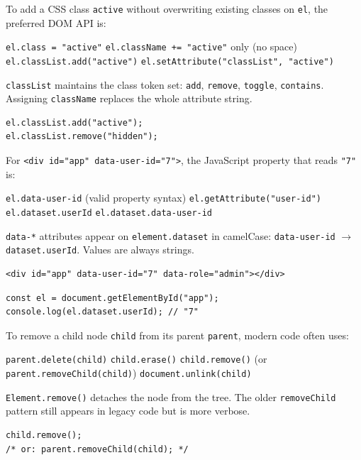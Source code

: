 \newpage
\question[4]
To add a CSS class \texttt{active} without overwriting existing classes on \texttt{el}, the preferred DOM API is:
\begin{choices}
  \choice \texttt{el.class = "active"}
  \choice \texttt{el.className += "active"} only (no space)
  \CorrectChoice \texttt{el.classList.add("active")}
  \choice \texttt{el.setAttribute("classList", "active")}
\end{choices}
\begin{solution}
  \texttt{classList} maintains the class token set: \texttt{add}, \texttt{remove}, \texttt{toggle}, \texttt{contains}. Assigning \texttt{className} replaces the whole attribute string.
\begin{lstlisting}[style=js]
el.classList.add("active");
el.classList.remove("hidden");
\end{lstlisting}
\end{solution}

\question[4]
For \texttt{<div id="app" data-user-id="7">}, the JavaScript property that reads \texttt{"7"} is:
\begin{choices}
  \choice \texttt{el.data-user-id} (valid property syntax)
  \choice \texttt{el.getAttribute("user-id")}
  \CorrectChoice \texttt{el.dataset.userId}
  \choice \texttt{el.dataset.data-user-id}
\end{choices}
\begin{solution}
  \texttt{data-*} attributes appear on \texttt{element.dataset} in camelCase: \texttt{data-user-id} $\rightarrow$ \texttt{dataset.userId}. Values are always strings.
\begin{lstlisting}[style=htmlinline]
<div id="app" data-user-id="7" data-role="admin"></div>
\end{lstlisting}
\begin{lstlisting}[style=js]
const el = document.getElementById("app");
console.log(el.dataset.userId); // "7"
\end{lstlisting}
\end{solution}

\question[4]
To remove a child node \texttt{child} from its parent \texttt{parent}, modern code often uses:
\begin{choices}
  \choice \texttt{parent.delete(child)}
  \choice \texttt{child.erase()}
  \CorrectChoice \texttt{child.remove()} (or \texttt{parent.removeChild(child)})
  \choice \texttt{document.unlink(child)}
\end{choices}
\begin{solution}
  \texttt{Element.remove()} detaches the node from the tree. The older \texttt{removeChild} pattern still appears in legacy code but is more verbose.
\begin{lstlisting}[style=js]
child.remove();
/* or: parent.removeChild(child); */
\end{lstlisting}
\end{solution}

